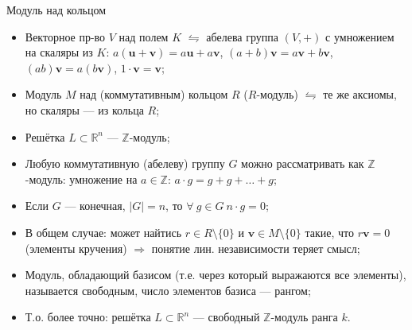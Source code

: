 \documentclass[serif, aspectratio=169]{beamer}
\begin{document}
\begin{frame}{Модуль над кольцом}
    \begin{itemize}
        \item Векторное пр-во $V$ над полем $K$ $\leftrightharpoons$ абелева группа $(V,+)$ с умножением на скаляры из $K$: $a(\mathbf{u}+\mathbf{v})=a\mathbf{u}+a\mathbf{v}$, $(a+b)\mathbf{v}=a\mathbf{v}+b\mathbf{v}$, $(ab)\mathbf{v}=a(b\mathbf{v})$, $1\cdot\mathbf{v}=\mathbf{v}$;
        \item Модуль $M$ над (коммутативным) кольцом $R$ ($R$-модуль) $\leftrightharpoons$ те же аксиомы, но скаляры --- из кольца $R$;
        \item Решётка $L\subset\mathbb{R}^n$ --- $\mathbb{Z}$-модуль;
        \item Любую коммутативную (абелеву) группу $G$ можно рассматривать как $\mathbb{Z}$-модуль: умножение на $a\in\mathbb{Z}$: $a\cdot g = g+g+\dots+g$;
        \item Если $G$ --- конечная, $|G|=n$, то $\forall\ g\in G\ n\cdot g=0$;
        \item В общем случае: может найтись $r\in R\setminus\{0\}$ и $\mathbf v\in M\setminus\{0\}$ такие, что $r\mathbf v=0$ (элементы кручения) $\Rightarrow$ понятие лин. независимости теряет смысл;
        \item Модуль, обладающий базисом (т.е. через который выражаются все элементы), называется свободным, число элементов базиса --- рангом;
        \item Т.о. более точно: решётка $L\subset\mathbb{R}^n$ --- свободный $\mathbb{Z}$-модуль ранга $k$.
    \end{itemize}
\end{frame}
\end{document}
